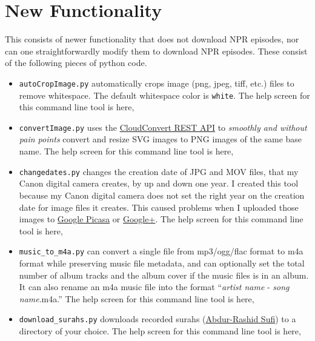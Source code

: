 \documentclass[]{article}
\begin{document}
\section{New Functionality}\label{sec:new_functionality}
This consists of newer functionality that does not download NPR episodes, nor can one straightforwardly modify them to download NPR episodes. These consist of the following pieces of python code.
\begin{itemize}
 \item {\verb|autoCropImage.py|} automatically crops image (png, jpeg, tiff, etc.) files to remove whitespace. The default whitespace color is {\verb|white|}. The help screen for this command line tool is here,
 
 
 \item {\verb|convertImage.py|} uses the \href{https://cloudconvert.com/apiconsole}{CloudConvert REST API} to \textit{smoothly and without pain points} convert and resize SVG images to PNG images of the same base name. The help screen for this command line tool is here,
 
 
 \item {\verb|changedates.py|} changes the creation date of JPG and MOV files, that my Canon digital camera creates, by up and down one year. I created this tool because my Canon digital camera does not set the right year on the creation date for image files it creates. This caused problems when I uploaded those images to \href{https://picasaweb.google.com/home}{Google Picasa} or \href{https://plus.google.com/}{Google+}. The help screen for this command line tool is here,
 
 
 \item {\verb|music_to_m4a.py|} can convert a single file from mp3/ogg/flac format to m4a format while preserving music file metadata, and can optionally set the total number of album tracks and the album cover if the music files is in an album. It can also rename an m4a music file into the format ``\textit{artist name} - \textit{song name}.m4a.'' The help screen for this command line tool is here,
 
 
 \item {\verb|download_surahs.py|} downloads recorded surahs (\href{http://quranicaudio.com/quran/109}{Abdur-Rashid Sufi}) to a directory of your choice. The help screen for this command line tool is here,
 
\end{itemize}
\end{document}
